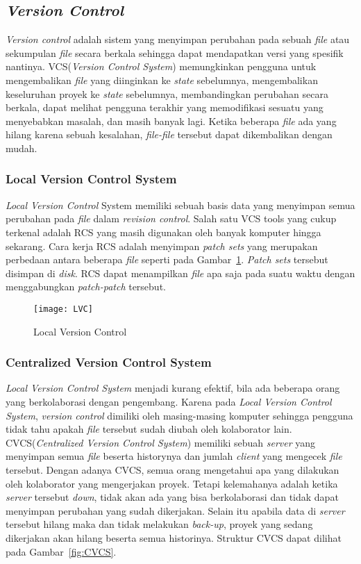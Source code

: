 \subsection{\textit{Version Control}}
\textit{Version control} adalah sistem yang menyimpan perubahan pada sebuah \textit{file} atau sekumpulan \textit{file} secara berkala sehingga dapat mendapatkan versi yang spesifik nantinya. VCS(\textit{Version Control System}) memungkinkan pengguna untuk mengembalikan \textit{file} yang diinginkan ke \textit{state} sebelumnya, mengembalikan keseluruhan proyek ke \textit{state} sebelumnya, membandingkan perubahan secara berkala, dapat melihat pengguna terakhir yang memodifikasi sesuatu yang menyebabkan masalah, dan masih banyak lagi. Ketika beberapa \textit{file} ada yang hilang karena sebuah kesalahan, \textit{file-file} tersebut dapat dikembalikan dengan mudah. 

\subsubsection{Local Version Control System}
\textit{Local Version Control} System memiliki sebuah basis data yang menyimpan semua perubahan pada \textit{file} dalam \textit{revision control}. Salah satu VCS tools yang cukup terkenal adalah RCS yang masih digunakan oleh banyak komputer hingga sekarang. Cara kerja RCS adalah menyimpan \textit{patch sets} yang merupakan perbedaan antara beberapa \textit{file} seperti pada Gambar~\ref{fig:LVC}. \textit{Patch sets} tersebut disimpan di \textit{disk}. RCS dapat menampilkan \textit{file} apa saja pada suatu waktu dengan menggabungkan \textit{patch-patch} tersebut.  

\begin{figure}[H]
	\centering  
	\texttt{[image: LVC]}  
	\caption[Local Version Control]{Local Version Control}
	\label{fig:LVC} 
\end{figure}

\subsubsection{Centralized Version Control System}
\textit{Local Version Control System} menjadi kurang efektif, bila ada beberapa orang yang berkolaborasi dengan pengembang. Karena pada \textit{Local Version Control System}, \textit{version control} dimiliki oleh masing-masing komputer sehingga pengguna tidak tahu apakah \textit{file} tersebut sudah diubah oleh kolaborator lain. CVCS(\textit{Centralized Version Control System}) memiliki sebuah \textit{server} yang menyimpan semua \textit{file} beserta historynya dan jumlah \textit{client} yang mengecek \textit{file} tersebut. Dengan adanya CVCS, semua orang mengetahui apa yang dilakukan oleh kolaborator yang mengerjakan proyek. Tetapi kelemahanya adalah ketika \textit{server} tersebut \textit{down}, tidak akan ada yang bisa berkolaborasi dan tidak dapat menyimpan perubahan yang sudah dikerjakan. Selain itu apabila data di \textit{server} tersebut hilang maka dan tidak melakukan \textit{back-up}, proyek yang sedang dikerjakan akan hilang beserta semua historinya. Struktur CVCS dapat dilihat pada Gambar~\ref{fig:CVCS}.

